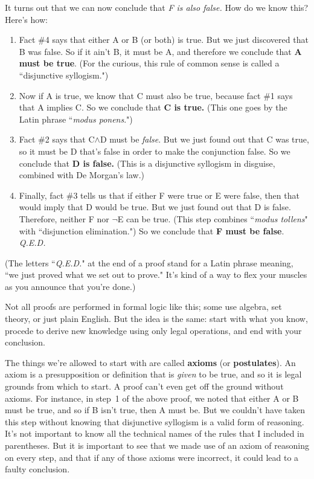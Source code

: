 It turns out that we can now conclude that \textit{F is also false.} How
do we know this? Here's how:
\begin{enumerate}
\item Fact \#4 says that either A or B (or both) is true. But we just
discovered that B was false. So if it ain't B, it must be A, and therefore
we conclude that \textbf{A must be true}. (For the curious, this rule of
common sense is called a ``disjunctive syllogism.")
\item Now if A is true, we know that C must also be true, because fact \#1
says that A implies C. So we conclude that \textbf{C is true.} (This one
goes by the Latin phrase ``\textit{modus ponens}.")
\item Fact \#2 says that C$\wedge$D must be \textit{false}. But we just
found out that C was true, so it must be D that's false in order to make
the conjunction false. So we conclude that \textbf{D is false.} (This is a
disjunctive syllogism in disguise, combined with De Morgan's law.)
\item Finally, fact \#3 tells us that if either F were true or E were false,
then that would imply that D would be true. But we just found out that D is
false. Therefore, neither F nor $\neg$E can be true. (This step combines
``\textit{modus tollens}" with ``disjunction elimination.")
So we conclude that \textbf{F must be false}. \textit{Q.E.D.}
\end{enumerate}
(The letters ``\textit{Q.E.D.}" at the end of a proof stand for a Latin
phrase meaning, ``we just proved what we set out to prove." It's kind of a
way to flex your muscles as you announce that you're done.)

Not all proofs are performed in formal logic like this; some use algebra,
set theory, or just plain English. But the idea is the same: start with
what you know, procede to derive new knowledge using only legal operations,
and end with your conclusion.

The things we're allowed to start with are called \textbf{axioms} (or
\textbf{postulates}). An axiom is a presupposition or definition that is
\textit{given} to be true, and so it is legal grounds from which to start.
A proof can't even get off the ground without axioms. For instance, in
step~1 of the above proof, we noted that either A or B must be true, and so
if B isn't true, then A must be.  But we couldn't have taken this step
without knowing that disjunctive syllogism is a valid form of reasoning.
It's not important to know all the technical names of the rules that I
included in parentheses. But it is important to see that we made use of an
axiom of reasoning on every step, and that if any of those axioms were
incorrect, it could lead to a faulty conclusion.

